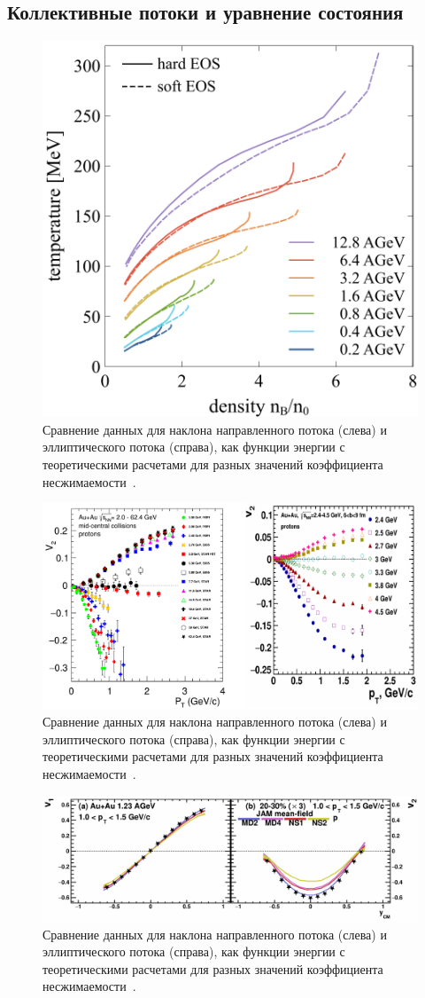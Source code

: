 \subsection{Коллективные потоки и уравнение состояния}

\begin{figure}[h]
    \centering
    \includegraphics[width=0.45\linewidth]{images/ranges_plots_UrQMD.pdf}
    \caption{Сравнение данных для наклона направленного потока (слева) и эллиптического потока (справа), как функции энергии с теоретическими расчетами для разных значений коэффициента несжимаемости~\cite{Danielewicz:2002pu}.}
    \label{fig:ranges_plots_UrQMD}
\end{figure}

\begin{figure}[h]
    \centering
    \includegraphics[width=0.3\linewidth]{images/particles-06-00036-g002.png}
    \caption{Сравнение данных для наклона направленного потока (слева) и эллиптического потока (справа), как функции энергии с теоретическими расчетами для разных значений коэффициента несжимаемости~\cite{Danielewicz:2002pu}.}
    \label{fig:v2_energy_data}
\end{figure}


\begin{figure}[h]
    \centering
    \includegraphics[width=0.3\linewidth]{images/particles-06-00036-g003.png}
    \caption{Сравнение данных для наклона направленного потока (слева) и эллиптического потока (справа), как функции энергии с теоретическими расчетами для разных значений коэффициента несжимаемости~\cite{Danielewicz:2002pu}.}
    \label{fig:v2_jam}
\end{figure}


